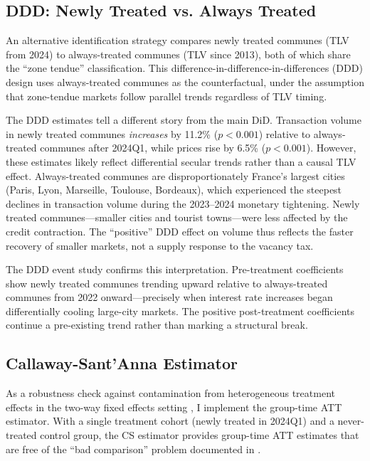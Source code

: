\documentclass[12pt]{article}
\begin{document}
\subsection{DDD: Newly Treated vs. Always Treated}

An alternative identification strategy compares newly treated communes (TLV from 2024) to always-treated communes (TLV since 2013), both of which share the ``zone tendue'' classification. This difference-in-difference-in-differences (DDD) design uses always-treated communes as the counterfactual, under the assumption that zone-tendue markets follow parallel trends regardless of TLV timing.

The DDD estimates tell a different story from the main DiD. Transaction volume in newly treated communes \textit{increases} by 11.2\% ($p < 0.001$) relative to always-treated communes after 2024Q1, while prices rise by 6.5\% ($p < 0.001$). However, these estimates likely reflect differential secular trends rather than a causal TLV effect. Always-treated communes are disproportionately France's largest cities (Paris, Lyon, Marseille, Toulouse, Bordeaux), which experienced the steepest declines in transaction volume during the 2023--2024 monetary tightening. Newly treated communes---smaller cities and tourist towns---were less affected by the credit contraction. The ``positive'' DDD effect on volume thus reflects the faster recovery of smaller markets, not a supply response to the vacancy tax.

The DDD event study confirms this interpretation. Pre-treatment coefficients show newly treated communes trending upward relative to always-treated communes from 2022 onward---precisely when interest rate increases began differentially cooling large-city markets. The positive post-treatment coefficients continue a pre-existing trend rather than marking a structural break.

\subsection{Callaway-Sant'Anna Estimator}

As a robustness check against contamination from heterogeneous treatment effects in the two-way fixed effects setting \citep{goodmanbacon2021difference, dechaisemartin2020two}, I implement the \citet{callaway2021difference} group-time ATT estimator. With a single treatment cohort (newly treated in 2024Q1) and a never-treated control group, the CS estimator provides group-time ATT estimates that are free of the ``bad comparison'' problem documented in \citet{borusyak2024revisiting}.
\end{document}
